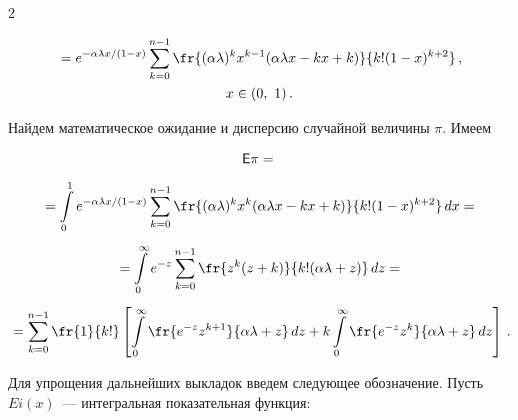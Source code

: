 \begin{multicols}{2}
{\begin{multline*}










{}=e^{-\alpha\lambda x / (1-x)}


\sum_{k=0}^{n-1}\fr{(\alpha\lambda)^k x^{k-1}(\alpha\lambda x-k


x+k)}{k!(1-x)^{k+2}}\,,\\


x\in(0,\ 1)\,.


\end{multline*}




}












Найдем математическое ожидание и дисперсию случайной величины $\pi$. Имеем


\begin{multline*}


\e\pi={}\\[5pt]


{}=\il{0}{1}e^{-\alpha\lambda x /(1-x)} \sum_{k=0}^{n-1}\fr{(\alpha\lambda)^k x^k(\alpha\lambda x -k x


+k)}{k! (1-x)^{k+2}}\,dx={}\\[5pt]


{}=\il{0}{\infty}e^{-z} \sum_{k=0}^{n-1}\fr{z^k(z+k)}{k!(\alpha\lambda+z)}\, dz={}\\[5pt]


{}=\sum_{k=0}^{n-1}\fr{1}{k!}\left[\il{0}{\infty}\fr{e^{-z}z^{k+1}}{\alpha\lambda+z}\,


dz+k\il{0}{\infty}\fr{e^{-z}z^k}{\alpha\lambda+z}\, dz\right]\,.


\end{multline*}





Для упрощения дальнейших выкладок введем следующее обозначение. Пусть $Ei(x)$~--- интегральная показательная функция:



\end{multicols}
